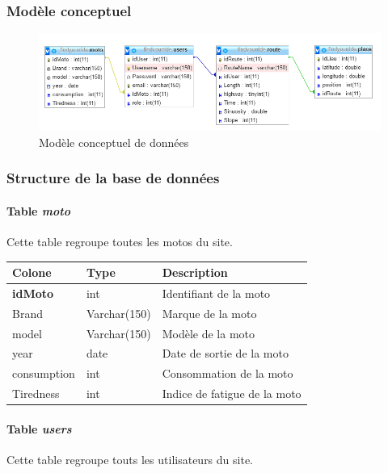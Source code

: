 \documentclass[a4paper]{article}
\newcommand{\bdd}{base de données}
\begin{document}
\subsubsection{Modèle conceptuel}
\begin{figure}[h]
	\centering
	\includegraphics[width=\textwidth]{./Images/MCD.png}
	\caption{Modèle conceptuel de données}
\end{figure}

\subsubsection{Structure de la \bdd}
\paragraph{Table \emph{moto}}
Cette table regroupe toutes les motos du site.

\begin{tabular}{|l|l|l|}
	\hline
	Colone          & Type         & Description                  \\ \hline\hline
	\textbf{idMoto} & int          & Identifiant de la moto       \\ \hline
	Brand           & Varchar(150) & Marque de la moto            \\ \hline
	model           & Varchar(150) & Modèle de la moto            \\ \hline
	year            & date         & Date de sortie de la moto    \\ \hline
	consumption     & int          & Consommation de la moto      \\ \hline
	Tiredness       & int          & Indice de fatigue de la moto \\ \hline
\end{tabular}

\paragraph{Table \emph{users}}
Cette table regroupe touts les utilisateurs du site.
\end{document}
